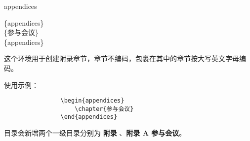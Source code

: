 \documentclass{ctxdoc}
\begin{document}
    \begin{environment}{appendices}
        \begin{syntax}
            \{appendices\} \\
            \{参与会议\} \\
            \{appendices\}
        \end{syntax}
        这个环境用于创建附录章节，章节不编码，包裹在其中的章节按大写英文字母编码。

        \begin{texnote}
            使用示例：
            \begin{verbatim}
                \begin{appendices}
                    \chapter{参与会议}
                \end{appendices}
            \end{verbatim}

            目录会新增两个一级目录分别为 \textbf{附录} 、\textbf{附录 A 参与会议}。

        \end{texnote}

    \end{environment}
\end{document}
